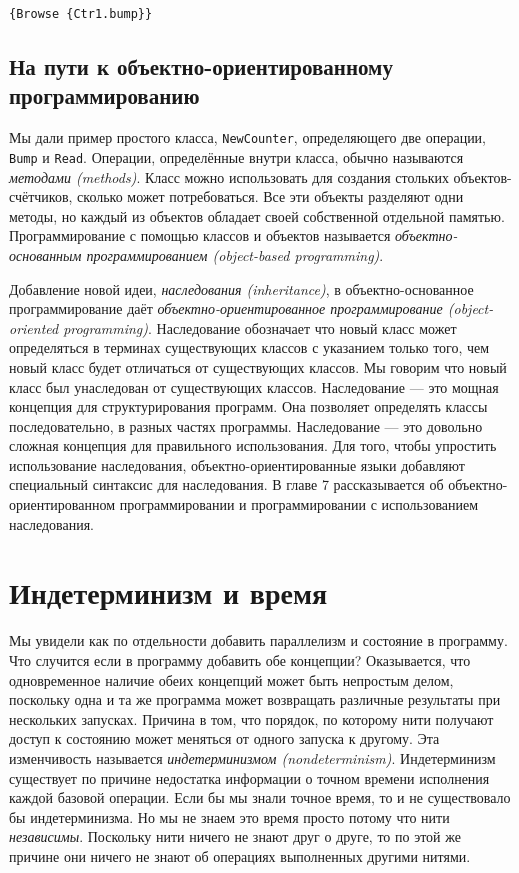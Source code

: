 \begin{lstlisting}
{Browse {Ctr1.bump}}
\end{lstlisting}

\subsection{На пути к объектно-ориентированному программированию}

Мы дали пример простого класса, \lstinline|NewCounter|, определяющего две операции, \lstinline|Bump| и \lstinline|Read|. Операции, определённые внутри класса, обычно называются \emph{методами (methods)}. Класс можно использовать для создания стольких объектов-счётчиков, сколько может потребоваться. Все эти объекты разделяют одни методы, но каждый из объектов обладает своей собственной отдельной памятью. Программирование с помощью классов и объектов называется \emph{объектно-основанным программированием ({object-based programming})}.

Добавление новой идеи, \emph{наследования (inheritance)}, в объектно-ос\-но\-ван\-ное программирование даёт \emph{объектно-ориентированное программирование (object-oriented programming)}. Наследование обозначает что новый класс может определяться в терминах существующих классов с указанием только того, чем новый класс будет отличаться от существующих классов. Мы говорим что новый класс был унаследован от существующих классов. Наследование --- это мощная концепция для структурирования программ. Она позволяет определять классы последовательно, в разных частях программы. Наследование --- это довольно сложная концепция для правильного использования. Для того, чтобы упростить использование наследования, объектно-ориентированные языки добавляют специальный синтаксис для наследования. В главе 7 рассказывается об объектно-ориентированном программировании и программировании с использованием наследования.

\section{Индетерминизм и время}\label{section:indeterminism_and_time}

Мы увидели как по отдельности добавить параллелизм и состояние в программу. Что случится если в программу добавить обе концепции? Оказывается, что одновременное наличие обеих концепций может быть непростым делом, поскольку одна и та же программа может возвращать различные результаты при нескольких запусках. Причина в том, что порядок, по которому нити получают доступ к состоянию может меняться от одного запуска к другому. Эта изменчивость называется \emph{индетерминизмом (nondeterminism)}. Индетерминизм существует по причине недостатка информации о точном времени исполнения каждой базовой операции. Если бы мы знали точное время, то и не существовало бы индетерминизма. Но мы не знаем это время просто потому что нити \emph{независимы}. Поскольку нити ничего не знают друг о друге, то по этой же причине они ничего не знают об операциях выполненных другими нитями.

